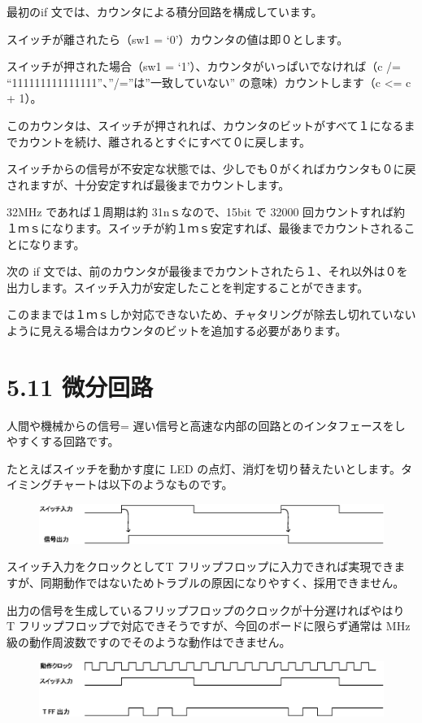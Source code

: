 \documentclass[letterpaper,10pt,dvipdfmx]{sphinxmanual}
\begin{document}
最初のif 文では、カウンタによる積分回路を構成しています。

スイッチが離されたら（sw1 = `0'）カウンタの値は即０とします。

スイッチが押された場合（sw1 = `1'）、カウンタがいっぱいでなければ（c /= ``111111111111111''、''/=''は''一致していない'' の意味）カウントします（c \textless{}= c + 1）。

このカウンタは、スイッチが押されれば、カウンタのビットがすべて１になるまでカウントを続け、離されるとすぐにすべて０に戻します。

スイッチからの信号が不安定な状態では、少しでも０がくればカウンタも０に戻されますが、十分安定すれば最後までカウントします。

32MHz であれば１周期は約 31nｓなので、15bit で 32000 回カウントすれば約１ｍｓになります。スイッチが約１ｍｓ安定すれば、最後までカウントされることになります。

次の if 文では、前のカウンタが最後までカウントされたら１、それ以外は０を出力します。スイッチ入力が安定したことを判定することができます。

このままでは１ｍｓしか対応できないため、チャタリングが除去し切れていないように見える場合はカウンタのビットを追加する必要があります。


\section{5.11 微分回路}
\label{05_try:id18}
人間や機械からの信号= 遅い信号と高速な内部の回路とのインタフェースをしやすくする回路です。

たとえばスイッチを動かす度に LED の点灯、消灯を切り替えたいとします。タイミングチャートは以下のようなものです。
\begin{figure}[htbp]
\centering

\includegraphics{figure21.eps}
\end{figure}

スイッチ入力をクロックとしてT フリップフロップに入力できれば実現できますが、同期動作ではないためトラブルの原因になりやすく、採用できません。

出力の信号を生成しているフリップフロップのクロックが十分遅ければやはり T フリップフロップで対応できそうですが、今回のボードに限らず通常は MHz 級の動作周波数ですのでそのような動作はできません。
\begin{figure}[htbp]
\centering

\includegraphics{figure22.eps}
\end{figure}
\end{document}
